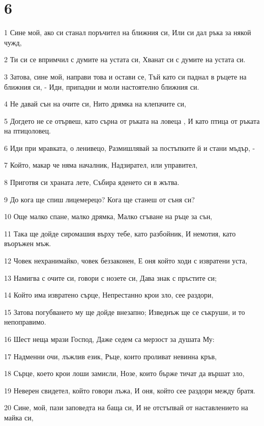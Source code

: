 \chapter{6}

\par 1 Сине мой, ако си станал поръчител на ближния си, Или си дал ръка за някой чужд,
\par 2 Ти си се впримчил с думите на устата си, Хванат си с думите на устата си.
\par 3 Затова, сине мой, направи това и остави се, Тъй като си паднал в ръцете на ближния си, - Иди, припадни и моли настоятелно ближния си.
\par 4 Не давай сън на очите си, Нито дрямка на клепачите си,
\par 5 Догдето не се отървеш, като сърна от ръката на ловеца , И като птица от ръката на птицоловец.
\par 6 Иди при мравката, о ленивецо, Размишлявай за постъпките й и стани мъдър, -
\par 7 Който, макар че няма началник, Надзирател, или управител,
\par 8 Приготвя си храната лете, Събира яденето си в жътва.
\par 9 До кога ще спиш лицемерецо? Кога ще станеш от съня си?
\par 10 Още малко спане, малко дрямка, Малко сгъване на ръце за сън,
\par 11 Така ще дойде сиромашия върху тебе, като разбойник, И немотия, като въоръжен мъж.
\par 12 Човек нехранимайко, човек беззаконен, Е оня който ходи с извратени уста,
\par 13 Намигва с очите си, говори с нозете си, Дава знак с пръстите си;
\par 14 Който има извратено сърце, Непрестанно крои зло, сее раздори,
\par 15 Затова погубването му ще дойде внезапно; Изведнъж ще се съкруши, и то непоправимо.
\par 16 Шест неща мрази Господ, Даже седем са мерзост за душата Му:
\par 17 Надменни очи, лъжлив език, Ръце, които проливат невинна кръв,
\par 18 Сърце, което крои лоши замисли, Нозе, които бърже тичат да вършат зло,
\par 19 Неверен свидетел, който говори лъжа, И оня, който сее раздори между братя.
\par 20 Сине, мой, пази заповедта на баща си, И не отстъпвай от наставлението на майка си,
